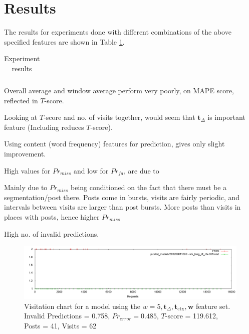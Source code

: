 \documentclass[12 pt]{article}
\begin{document}
\section{Results}

The results for experiments done with different combinations of the above specified features are shown in Table \ref{expt1}.
\begin{table}
	\footnotesize
	\begin{centering}
	\begin{tabular}{|l|c|c|c|c|c|c|c|c|}
	\hline
	
	\hline
	\end{tabular}
	\caption{Experiment results}
	\label{expt1}
\end{centering}
\end{table}

Overall average and window average perform very poorly, on MAPE score, reflected in $T$-score.

Looking at $T$-score and no. of visits together, would seem that $\textbf{t}_\Delta$ is important feature (Including reduces $T$-score).

Using content (word frequency) features for prediction, gives only slight improvement.

High values for $Pr_{miss}$ and low for $Pr_{fa}$, are due to

	Mainly due to $Pr_{miss}$ being conditioned on the fact that there must be a segmentation/post there.
	Posts come in bursts, visits are fairly periodic, and intervals between visits are larger than post bursts.
	More posts than visits in places with posts, hence higher $Pr_{miss}$

	High no. of invalid predictions.
\begin{landscape}
\begin{figure}
	\centering
	\includegraphics[scale=0.5]{example_seq.png}
	\caption{Visitation chart for a model using the $w=5, \mathbf{t}_\Delta, \mathbf{t}_{\text{ctx}},\mathbf{w}$ feature set. Invalid Predictions = 0.758, $Pr_{error} =  0.485$, $T$-score = 119.612, Posts = 41, Visits = 62}
\end{figure}
\end{landscape}




\end{document}
